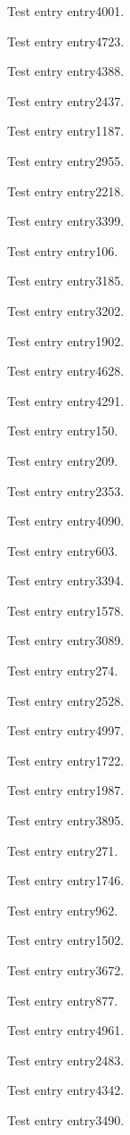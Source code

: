 Test entry \gls{entry4001}.

Test entry \gls{entry4723}.

Test entry \gls{entry4388}.

Test entry \gls{entry2437}.

Test entry \gls{entry1187}.

Test entry \gls{entry2955}.

Test entry \gls{entry2218}.

Test entry \gls{entry3399}.

Test entry \gls{entry106}.

Test entry \gls{entry3185}.

Test entry \gls{entry3202}.

Test entry \gls{entry1902}.

Test entry \gls{entry4628}.

Test entry \gls{entry4291}.

Test entry \gls{entry150}.

Test entry \gls{entry209}.

Test entry \gls{entry2353}.

Test entry \gls{entry4090}.

Test entry \gls{entry603}.

Test entry \gls{entry3394}.

Test entry \gls{entry1578}.

Test entry \gls{entry3089}.

Test entry \gls{entry274}.

Test entry \gls{entry2528}.

Test entry \gls{entry4997}.

Test entry \gls{entry1722}.

Test entry \gls{entry1987}.

Test entry \gls{entry3895}.

Test entry \gls{entry271}.

Test entry \gls{entry1746}.

Test entry \gls{entry962}.

Test entry \gls{entry1502}.

Test entry \gls{entry3672}.

Test entry \gls{entry877}.

Test entry \gls{entry4961}.

Test entry \gls{entry2483}.

Test entry \gls{entry4342}.

Test entry \gls{entry3490}.


